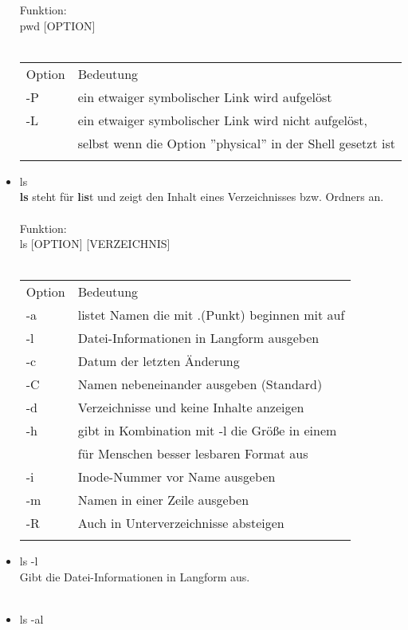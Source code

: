 \begin{itemize}
			Funktion:\\
			pwd [OPTION]\\ \\
			\begin{tabular}{ll}
				Option & Bedeutung \\
				-P & ein etwaiger symbolischer Link wird aufgel\"ost\\
				-L & ein etwaiger symbolischer Link wird nicht aufgel\"ost,\\
				 & selbst wenn die Option ''physical'' in der Shell gesetzt ist\\ \\
			\end{tabular}
			\item ls \\
			\textbf{ls} steht f\"ur \textbf{l}i\textbf{s}t und zeigt den Inhalt eines Verzeichnisses bzw. Ordners an.\\ \\
			Funktion:\\
			ls [OPTION] [VERZEICHNIS]\\ \\
			\begin{tabular}{ll}
				Option & Bedeutung \\
				-a & listet Namen die mit .(Punkt) beginnen mit auf\\
				-l & Datei-Informationen in Langform ausgeben\\
				-c & Datum der letzten \"Anderung\\
				-C & Namen nebeneinander ausgeben (Standard)\\
				-d & Verzeichnisse und keine Inhalte anzeigen\\
				-h & gibt in Kombination mit -l die Gr\"oße in einem\\
				 & für Menschen besser lesbaren Format aus\\
				-i & Inode-Nummer vor Name ausgeben\\
				-m & Namen in einer Zeile ausgeben\\
				-R & Auch in Unterverzeichnisse absteigen\\ \\
			\end{tabular}
			\item ls -l\\
			Gibt die Datei-Informationen in Langform aus.\\ \\
			\item ls -al\\

\end{itemize}
